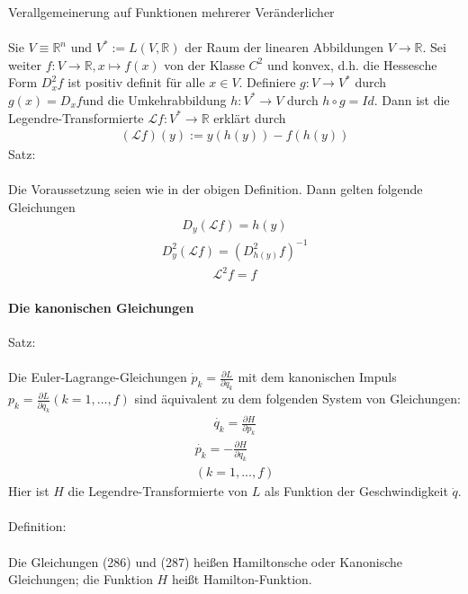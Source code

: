 \documentclass[10pt,a4paper]{article}
\begin{document}
Verallgemeinerung auf Funktionen mehrerer Veränderlicher\\
\\
Sie $V\equiv \mathbb{R}^n $ und $ V^* := L(V,\mathbb{R}) $ der Raum der linearen Abbildungen $ V \longrightarrow \mathbb{R}$. Sei weiter $ f: V \longrightarrow \mathbb{R}, x \longmapsto f(x) $ von der Klasse $C^2$ und konvex, d.h. die Hessesche Form $ D_x^2f$ ist positiv definit für alle $ x \in V $. Definiere $ g: V \longrightarrow V^* $ durch $ g(x) = D_xf $und die Umkehrabbildung $ h: V^* \longrightarrow V $ durch $ h \circ g= Id $. Dann ist die Legendre-Transformierte $ \mathcal{L}f: V^* \longrightarrow  \mathbb{R}$ erklärt durch
\begin{align}
( \mathcal{L} f)(y):= y(h(y))-f(h(y))
\end{align}  
Satz: \\
\\
Die Voraussetzung seien wie in der obigen Definition. Dann gelten folgende Gleichungen
\begin{align}
D_y(\mathcal{L}f)=h(y)
\end{align}
\begin{align}
D_y^2( \mathcal{L}f)=(D_{h(y)}^2f)^{-1}
\end{align}
\begin{align}
\mathcal{L}^2f=f
\end{align}
\paragraph{Die kanonischen Gleichungen} $\,$\\
Satz:\\
\\
Die Euler-Lagrange-Gleichungen $ \dot{p}_k= \frac{\partial L}{\partial q_k} $ mit dem kanonischen Impuls $ p_k= \frac{\partial
L}{\partial \dot{q_k}} (k=1,...,f) $ sind äquivalent zu dem folgenden System von Gleichungen:
\begin{align}
\dot{q_k}= \frac{\partial H}{\partial p_k}
\end{align}
\begin{align}
\dot{p_k}=-\frac{\partial H}{\partial q_k}\ 
\\
(k=1,...,f)
\end{align}
Hier ist $H$ die Legendre-Transformierte von $L$ als Funktion der Geschwindigkeit $ \dot{q}$.\\
\\
Definition:\\
\\
Die Gleichungen (286) und (287) heißen Hamiltonsche oder Kanonische Gleichungen; die Funktion $H$ heißt Hamilton-Funktion.
\end{document}
